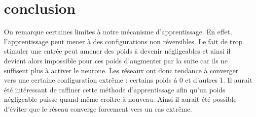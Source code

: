 \section{conclusion}
On remarque certaines limites à notre mécanisme d'apprentissage. En effet,
l'apprentissage peut mener à des configurations non réversibles. Le fait de
trop stimuler une entrée peut amener des poids à devenir négligeables et ainsi
il devient alors impossible pour ces poids d'augmenter par la suite car ils
ne suffisent plus à activer le neurone. Les réseaux ont donc tendance à converger
vers une certaine configuration extrême : certains poids à 0 et d'autres 1. Il
aurait été intéressant de raffiner cette méthode d'apprentissage afin qu'un 
poids négligeable puisse quand même croître à nouveau. Ainsi il aurait
été possible d'éviter que le réseau converge forcement vers un cas extrême.
